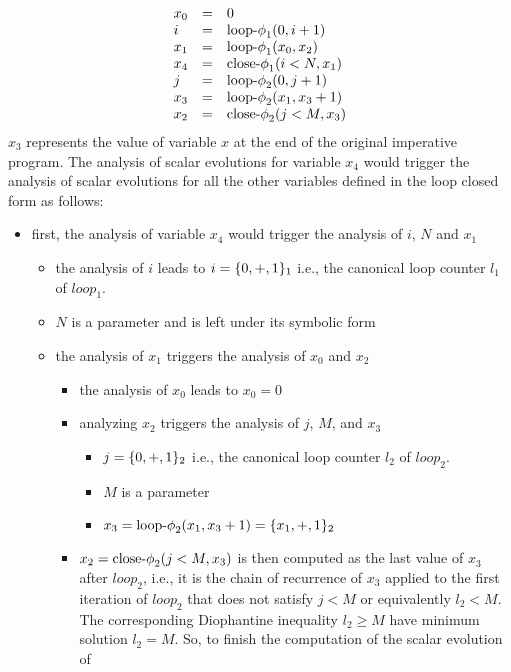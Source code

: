 {\[
\begin{array}{lcl}
  x_0 &=& 0\\
  i &=& \textrm{loop-$\phi$}_1 (0, i + 1)\\
  x_1 &=& \textrm{loop-$\phi$}_1 (x_0, x_2)\\
  x_4 &=& \textrm{close-$\phi$}_1 (i < N, x_1)\\
  j &=& \textrm{loop-$\phi$}_2 (0, j + 1)\\
  x_3 &=& \textrm{loop-$\phi$}_2 (x_1, x_3 + 1)\\
  x_2 &=& \textrm{close-$\phi$}_2 (j < M, x_3)\\
\end{array}
\]
$x_3$ represents the value of variable $x$ at the end of the
original imperative program.  The analysis of scalar evolutions for
variable $x_4$ would trigger the analysis of scalar evolutions for all
the other variables defined in the loop closed \SSA{} form as follows:
\begin{itemize}
\item first, the analysis of variable $x_4$ would trigger the analysis
  of $i$, $N$ and $x_1$
  \begin{itemize}
  \item the analysis of $i$ leads to $i = \{0, +, 1\}_1$ i.e., the canonical loop counter $l_1$ of $loop_1$.
  \item $N$ is a parameter and is left under its symbolic form
  \item the analysis of $x_1$ triggers the analysis of $x_0$ and $x_2$
    \begin{itemize}
    \item the analysis of $x_0$ leads to $x_0 = 0$
    \item analyzing $x_2$ triggers the analysis of $j$, $M$, and $x_3$
      \begin{itemize}
      \item $j = \{0, +, 1\}_2$ i.e., the canonical loop counter $l_2$ of $loop_2$.
      \item $M$ is a parameter
      \item $x_3 = \textrm{loop-$\phi$}_2 (x_1, x_3 + 1) = \{x_1, +, 1\}_2$
      \end{itemize}
    \item $x_2 = \textrm{close-$\phi$}_2 (j < M, x_3)$ is then computed as the last value of $x_3$ after
      $loop_2$, i.e., it is the chain of recurrence of $x_3$ applied
      to the first iteration of $loop_2$ that does not satisfy $j < M$ or equivalently $l_2<M$. The corresponding Diophantine inequality $l_2\geq M$  have minimum solution $l_2=M$. So, to finish the computation of the scalar evolution of

\end{itemize}
\end{itemize}
\end{itemize}}
